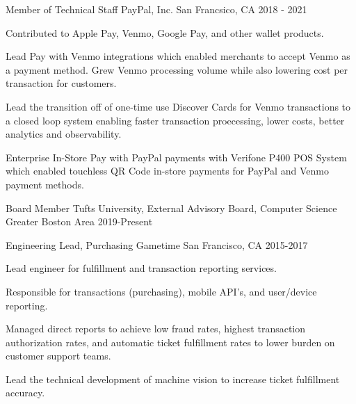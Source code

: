 
\begin{cventries}

  \cventry
    {Member of Technical Staff} %
    {PayPal, Inc.} %
    {San Francsico, CA} %
    {2018 - 2021} %
    {
      \begin{cvitems} %
        \item {Contributed to Apple Pay, Venmo, Google Pay, and other wallet products.}
        \item {Lead Pay with Venmo integrations which enabled merchants to accept Venmo as a payment method. Grew Venmo processing volume while also lowering cost per transaction for customers.}
        \item {Lead the transition off of one-time use Discover Cards for Venmo transactions to a closed loop system enabling faster transaction proecessing, lower costs, better analytics and observability.}
        \item {Enterprise In-Store Pay with PayPal payments with Verifone P400 POS System which enabled touchless QR Code in-store payments for PayPal and Venmo payment methods.}
      \end{cvitems}
    }

  \cventry
    {Board Member} %
    {Tufts University, External Advisory Board, Computer Science} %
    {Greater Boston Area} %
    {2019-Present} %
    {
      \begin{cvitems} %
      \end{cvitems}
    }

  \cventry
    {Engineering Lead, Purchasing} %
    {Gametime} %
    {San Francisco, CA} %
    {2015-2017} %
    {
      \begin{cvitems} %
        \item {Lead engineer for fulfillment and transaction reporting services.}
        \item {Responsible for transactions (purchasing), mobile API's, and user/device reporting.}
        \item {Managed direct reports to achieve low fraud rates, highest transaction authorization rates, and automatic ticket fulfillment rates to lower burden on customer support teams.}
        \item {Lead the technical development of machine vision to increase ticket fulfillment accuracy.}
      \end{cvitems}
    }


\end{cventries}
